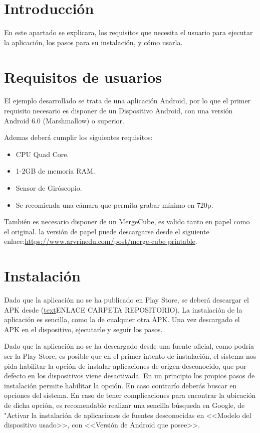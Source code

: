 
\section{Introducción}
 En este apartado se explicara, los requisitos que necesita el usuario para ejecutar la aplicación, los pasos para su instalación, y cómo usarla.
  
\section{Requisitos de usuarios}
 El ejemplo desarrollado se trata de una aplicación Android, por lo que el primer requisito necesario es disponer de un Dispositivo Android, con una versión Android 6.0 (Marshmallow) o superior.
  
 Ademas deberá cumplir los siguientes requisitos\cite{vuforia_devices}:
 \begin{itemize}
 	\item CPU Quad Core.
 	\item 1-2GB de memoria RAM.
 	\item Sensor de Giróscopio.
 	\item Se recomienda una cámara que permita grabar mínimo en 720p.  
 \end{itemize}
También es necesario disponer de un MergeCube, es valido tanto en papel como el original.
la versión de papel puede descargarse desde el siguiente enlace:\url{https://www.arvrinedu.com/post/merge-cube-printable}. 

\section{Instalación}

Dado que la aplicación no se ha publicado en Play Store, se deberá descargar el APK desde (\href{URL}{text}ENLACE CARPETA REPOSITORIO).
La instalación de la aplicación es sencilla, como la de cualquier otra APK. Una vez descargado el APK en el dispositivo, ejecutarle y seguir los pasos. 

Dado que la aplicación no se ha descargado desde una fuente oficial, como podría ser la Play Store, es posible que en el primer intento de instalación, el sistema nos pida habilitar la opción de instalar aplicaciones de origen desconocido, que por defecto en los dispositivos viene desactivada.
En un principio los propios pasos de instalación permite habilitar la opción. En caso contrarío deberás buscar en opciones del sistema. En caso de tener complicaciones para encontrar la ubicación de dicha opción, es recomendable realizar una sencilla búsqueda en Google, de "Activar la instalación de aplicaciones de fuentes desconocidas en <<Modelo del dispositivo usado>>, con <<Versión de Android que posee>>.


